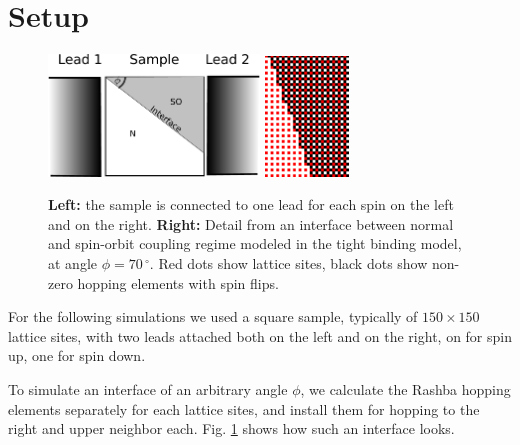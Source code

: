 \section{Setup}
\label{sec:numeric-setup}

\begin{figure}
    \begin{center}
        \includegraphics[width=0.5\textwidth]{sample-lead-interface.pdf}%
        \hspace{0.1\textwidth}%
        \includegraphics[width=0.2\textwidth]{hopping.png}
    \end{center}
    \caption{\textbf{Left:} the sample is connected to one lead for each spin
        on the left and on the right.
        \textbf{Right:}
        Detail from an interface between normal and spin-orbit coupling regime modeled
        in the tight binding model, at angle $\phi = 70\,^{\circ}$.
        Red dots show lattice sites, black dots
        show non-zero hopping elements with spin flips.}
    \label{fig:interface-setup}
\end{figure}

For the following simulations we used a square sample, typically of $150
\times 150$ lattice sites, with two leads attached both on the left and on the
right, on for spin up, one for spin down.

To simulate an interface of an arbitrary angle $\phi$, we calculate the Rashba
hopping elements separately for each lattice sites, and install them for
hopping to the right and upper neighbor each. Fig. \ref{fig:interface-setup}
shows how such an interface looks.

